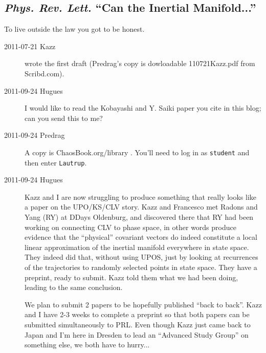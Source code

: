 \subsection{\emph{Phys. Rev. Lett.} ``Can the Inertial Manifold...''}

\begin{bartlett}
To live outside the law   %
you got to be honest.
\end{bartlett}

\begin{description}
\item[2011-07-21 Kazz] wrote the first draft (Predrag's
copy is dowloadable
{110721Kazz.pdf} from Scribd.com).

\item[2011-09-24 Hugues]
I would like to read the  Kobayashi and Y. Saiki paper you
cite in this blog; can you send this to me?

\item[2011-09-24 Predrag]
A copy is ChaosBook.org/library
.
You'll need to log in as \texttt{student} and then enter \texttt{Lautrup}.

\item[2011-09-24 Hugues]
Kazz and I are now struggling to produce something that really looks like
a paper on the UPO/KS/CLV story. Kazz and Francesco met Radons and Yang
(RY) at DDays Oldenburg, and discovered there that RY had been working on
connecting CLV to phase space, in other words produce evidence that the
``physical'' covariant vectors do indeed constitute a local linear
approximation of the inertial manifold everywhere in state space. They
indeed did that, without using UPOS, just by looking at recurrences of
the trajectories to randomly selected points in state space. They have a
preprint, ready to submit. Kazz told them what we had been doing, leading
to the same conclusion.

We plan to submit 2 papers to be hopefully published ``back to back''.
Kazz and I have 2-3 weeks to complete a preprint so that both papers can
be submitted simultaneously to PRL. Even though Kazz just came back to
Japan and I'm here in Dresden to lead an ``Advanced Study Group'' on
something else, we both have to hurry...


\end{description}
